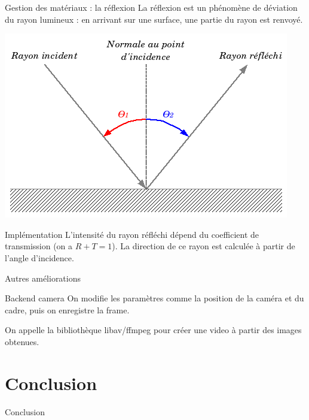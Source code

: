 \documentclass{beamer}
\begin{document}
\begin{frame}{Gestion des matériaux : la réflexion}
La réflexion est un phénomène de déviation du rayon lumineux : en arrivant sur
une surface, une partie du rayon est renvoyé.

\begin{center}
  \includegraphics[scale=0.4]{img/introduction.png}
\end{center}

\begin{block}{Implémentation}
L'intensité du rayon réfléchi dépend du coefficient de transmission (on a
$R+T=1$). La direction de ce rayon est calculée à partir de l'angle d'incidence.
\end{block}
\end{frame}

\begin{frame}{Autres améliorations}
\begin{block}{Backend camera}
On modifie les paramètres comme la position de la caméra et du cadre, puis on enregistre la frame.

On appelle la bibliothèque libav/ffmpeg pour créer une video à partir des images obtenues.
\end{block}
\end{frame}

\section{Conclusion}
\begin{frame}{Conclusion}
\end{frame}
\end{document}
